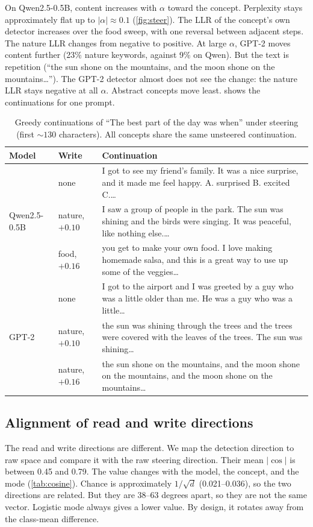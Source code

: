 \documentclass[11pt]{article}
\begin{document}
On Qwen2.5-0.5B, content increases with $\alpha$ toward the concept. Perplexity stays approximately flat up
to $|\alpha|\approx0.1$ (\cref{fig:steer}). The LLR of the concept's own detector increases over the food
sweep, with one reversal between adjacent steps. The nature LLR changes from negative to positive. At large
$\alpha$, GPT-2 moves content further (23\% nature keywords, against 9\% on Qwen). But the text is
repetition (``the sun shone on the mountains, and the moon shone on the mountains\ldots''). The GPT-2
detector almost does not see the change: the nature LLR stays negative at all $\alpha$. Abstract concepts
move least.  shows the continuations for one prompt.

\begin{table}[t]
\centering
\footnotesize
\caption{Greedy continuations of ``The best part of the day was when'' under steering (first
${\sim}130$ characters). All concepts share the same unsteered continuation.}
\label{tab:examples}
\begin{tabularx}{\textwidth}{llX}
\toprule
Model & Write & Continuation \\
\midrule
\multirow{3}{*}{Qwen2.5-0.5B}
 & none & I got to see my friend's family. It was a nice surprise, and it made me feel happy. A. surprised B. excited C.\ldots \\
 & nature, $+0.10$ & I saw a group of people in the park. The sun was shining and the birds were singing. It was peaceful, like nothing else.\ldots \\
 & food, $+0.16$ & you get to make your own food. I love making homemade salsa, and this is a great way to use up some of the veggies\ldots \\
\midrule
\multirow{3}{*}{GPT-2}
 & none & I got to the airport and I was greeted by a guy who was a little older than me. He was a guy who was a little\ldots \\
 & nature, $+0.10$ & the sun was shining through the trees and the trees were covered with the leaves of the trees. The sun was shining\ldots \\
 & nature, $+0.16$ & the sun shone on the mountains, and the moon shone on the mountains, and the moon shone on the mountains\ldots \\
\bottomrule
\end{tabularx}
\end{table}

\subsection{Alignment of read and write directions}
\label{sec:cosine}
The read and write directions are different. We map the detection direction to raw space and compare it
with the raw steering direction. Their mean $|\cos|$ is between 0.45 and 0.79. The value changes with the
model, the concept, and the mode (\cref{tab:cosine}). Chance is approximately $1/\sqrt d$ (0.021--0.036),
so the two directions are related. But they are 38--63 degrees apart, so they are not the same vector.
Logistic mode always gives a lower value. By design, it rotates away from the class-mean difference.
\end{document}
